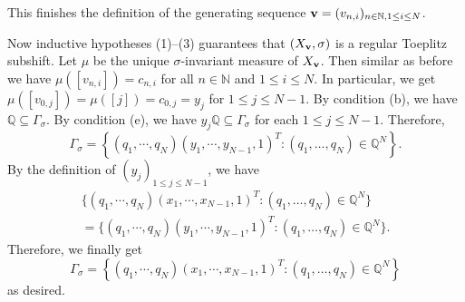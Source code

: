 \documentclass{amsart}
\theoremstyle{definition}
\theoremstyle{problem}
\theoremstyle{remark}
\numberwithin{equation}{section}
\begin{document}
This finishes the definition of the generating sequence ${\bf v}=(v_{n,i})_{n\in\mathbb{N}, 1\leq i\leq N}$. 

Now inductive hypotheses (1)--(3) guarantees that $(X_{\bf v}, \sigma)$ is a regular Toeplitz subshift. Let $\mu$ be the unique $\sigma$-invariant measure of $X_{\bf v}$. Then similar as before we have $\mu([v_{n,i}])=c_{n,i}$ for all $n\in\mathbb{N}$ and $1\leq i\leq N$. In particular, we get $\mu([v_{0,j}])=\mu([j])=c_{0,j}=y_j$ for $1\leq j\leq N-1$. By condition (b), we have $\mathbb{Q}\subseteq \Gamma_\sigma$. By condition (e), we have $y_j\mathbb{Q}\subseteq \Gamma_\sigma$ for each $1\leq j\leq N-1$. Therefore,
 $$\Gamma_\sigma=\left\{(q_1,\cdots,q_N)(y_1,\cdots,y_{N-1},1)^T\colon (q_1,\dots, q_N)\in \mathbb{Q}^N\right\}. $$
By the definition of $(y_j)_{1\leq j\leq N-1}$, we have
$$\begin{array}{c} \{(q_1,\cdots,q_N)(x_1,\cdots,x_{N-1},1)^T\colon (q_1,\dots, q_N)\in\mathbb{Q}^N\} \\ =\{(q_1,\cdots,q_N)(y_1,\cdots,y_{N-1},1)^T\colon (q_1,\dots, q_N)\in\mathbb{Q}^N\}.
\end{array}$$ 
Therefore, we finally get
 $$\Gamma_\sigma=\left\{(q_1,\cdots,q_N)(x_1,\cdots,x_{N-1},1)^T\colon (q_1,\dots, q_N)\in \mathbb{Q}^N\right\} $$
 as desired.
 

\end{document}

